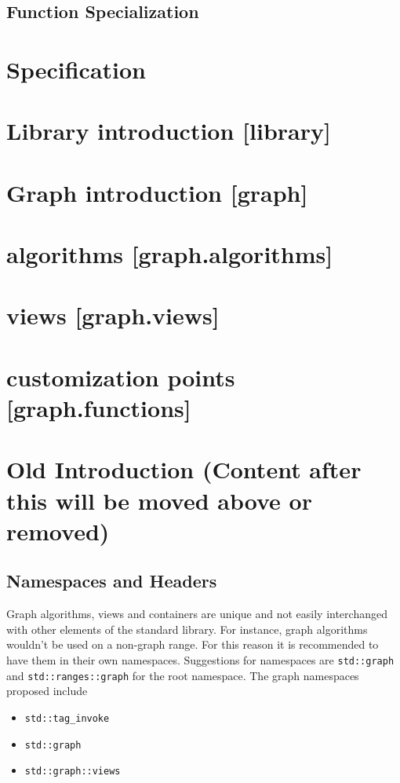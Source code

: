 \documentclass[10pt,onecolumn]{article}
\newcommand{\tcode}[1]{\lstinline[breaklines=true]{#1}}
\begin{document}
\subsection{Function Specialization}

\section{Specification}
\section{Library introduction [library]}
\section{Graph introduction [graph]}
\section{algorithms [graph.algorithms]}
\section{views [graph.views]}
\section{customization points [graph.functions]}


\section{Old Introduction (Content after this will be moved above or removed)}

\subsection{Namespaces and Headers}
Graph algorithms, views and containers are unique and not easily interchanged with other elements of the standard library. For
instance, graph algorithms wouldn't be used on a non-graph range. For this reason it is recommended to have them in their own 
namespaces. Suggestions for namespaces are \tcode{std::graph} and
\tcode{std::ranges::graph} for the root namespace. The graph namespaces proposed include
\begin{itemize}
\item[]\tcode{std::tag_invoke}
\item[]\tcode{std::graph}
\item[]\tcode{std::graph::views}
\end{itemize}
\end{document}
